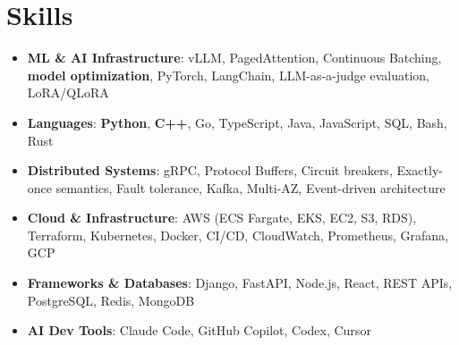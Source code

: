 \documentclass[letterpaper,11pt]{article}
\newcommand{\resumeSubHeadingListStart}{\begin{itemize}[leftmargin=0.15in, label={}]}
\newcommand{\resumeSubHeadingListEnd}{\end{itemize}}
\newcommand{\resumeSkillHeading}[2]{%
  \item\small{\textbf{#1}: #2 \vspace{-9pt}}%
}
\begin{document}
\section{Skills}
  \resumeSubHeadingListStart
    \resumeSkillHeading{ML \& AI Infrastructure}{vLLM, PagedAttention, Continuous Batching, \textbf{model optimization}, PyTorch, LangChain, LLM-as-a-judge evaluation, LoRA/QLoRA}
    \resumeSkillHeading{Languages}{\textbf{Python}, \textbf{C++}, Go, TypeScript, Java, JavaScript, SQL, Bash, Rust}
    \resumeSkillHeading{Distributed Systems}{gRPC, Protocol Buffers, Circuit breakers, Exactly-once semantics, Fault tolerance, Kafka, Multi-AZ, Event-driven architecture}
    \resumeSkillHeading{Cloud \& Infrastructure}{AWS (ECS Fargate, EKS, EC2, S3, RDS), Terraform, Kubernetes, Docker, CI/CD, CloudWatch, Prometheus, Grafana, GCP}
    \resumeSkillHeading{Frameworks \& Databases}{Django, FastAPI, Node.js, React, REST APIs, PostgreSQL, Redis, MongoDB}
    \resumeSkillHeading{AI Dev Tools}{Claude Code, GitHub Copilot, Codex, Cursor}
  \resumeSubHeadingListEnd
\end{document}
